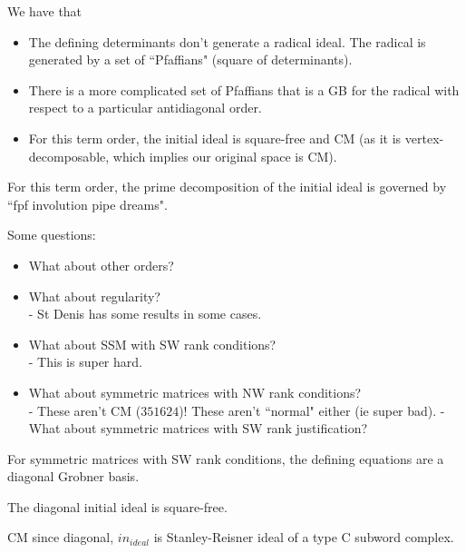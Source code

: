 \begin{theorem}
    We have that
    \begin{itemize}
        \item The defining determinants don't generate a radical ideal. The radical is generated by a set of ``Pfaffians" (square of determinants).
        \item There is a more complicated set of Pfaffians that is a GB for the radical with respect to a particular antidiagonal order.
        \item For this term order, the initial ideal is square-free and CM (as it is vertex-decomposable, which implies our original space is CM).
    \end{itemize}
    For this term order, the prime decomposition of the initial ideal is governed by ``fpf involution pipe dreams".
\end{theorem}

\begin{remark}
    Some questions:
    \begin{itemize}
        \item What about other orders?
        \item What about regularity?\\
        - St Denis has some results in some cases.
        \item What about SSM with SW rank conditions?\\
        - This is super hard.
        \item What about symmetric matrices with NW rank conditions?\\
        - These aren't CM ($351624$)! These aren't ``normal" either (ie super bad).
        - What about symmetric matrices with SW rank justification?
    \end{itemize}
\end{remark}

\begin{theorem}
    For symmetric matrices with SW rank conditions, the defining equations are a diagonal Grobner basis.
\end{theorem}

\begin{remark}
    The diagonal initial ideal is square-free.
\end{remark}

\begin{theorem}
    CM since diagonal, $in_{ideal} $ is Stanley-Reisner ideal of a type C subword complex.
\end{theorem}

